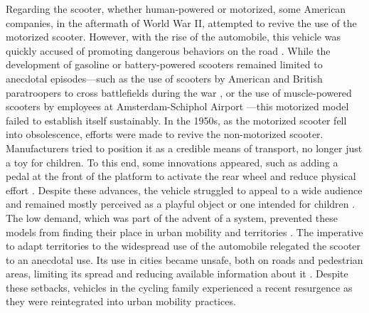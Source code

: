 \begin{refsegment}
Regarding the scooter, whether human-powered or motorized, some American companies, in the aftermath of World War II, attempted to revive the use of the motorized scooter. However, with the rise of the automobile, this vehicle was quickly accused of promoting dangerous behaviors on the road \textcolor{blue}{\autocite{smithsonian_magazine_motorized_2019}}. While the development of gasoline or battery-powered scooters remained limited to anecdotal episodes—such as the use of  scooters by American and British paratroopers to cross battlefields during the war \textcolor{blue}{\autocite{historia_trottinette_2013}}, or the use of muscle-powered scooters by employees at Amsterdam-Schiphol Airport \textcolor{blue}{\autocite{historia_trottinette_2013}}—this motorized model failed to establish itself sustainably. In the 1950s, as the motorized scooter fell into obsolescence, efforts were made to revive the non-motorized scooter. Manufacturers tried to position it as a credible means of transport, no longer just a toy for children. To this end, some innovations appeared, such as adding a pedal at the front of the platform to activate the rear wheel and reduce physical effort \textcolor{blue}{\autocite{arte_histoire_2014}}. Despite these advances, the vehicle struggled to appeal to a wide audience and remained mostly perceived as a playful object or one intended for children \textcolor{blue}{\autocite{jeux_et_compagnie_histoire_2013}}. The low demand, which was part of the advent of a  system, prevented these models from finding their place in urban mobility and territories \textcolor{blue}{\autocite{historia_trottinette_2013}}. The imperative to adapt territories to the widespread use of the automobile relegated the scooter to an anecdotal use. Its use in cities became unsafe, both on roads and pedestrian areas, limiting its spread and reducing available information about it \textcolor{blue}{\autocite{e-trottr_levolution_2019}}. Despite these setbacks, vehicles in the cycling family experienced a recent resurgence as they were reintegrated into urban mobility practices.%


\end{refsegment}
